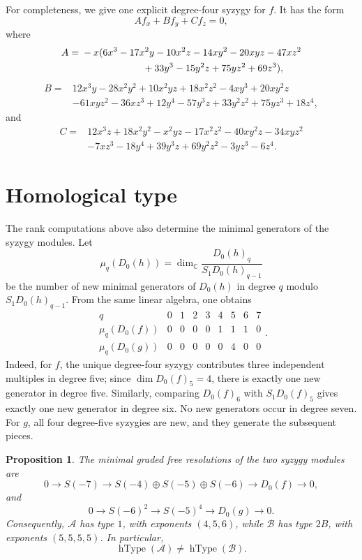 \documentclass[11pt]{amsart}
\newcommand{\CC}{\mathbb C}
\newcommand{\cA}{\mathcal A}
\newcommand{\cB}{\mathcal B}
\newcommand{\hType}{\operatorname{hType}}
\theoremstyle{plain}
\newtheorem{proposition}[theorem]{Proposition}
\theoremstyle{definition}
\numberwithin{equation}{section}
\begin{document}
For completeness, we give one explicit degree-four syzygy for \(f\).  It has the form
\[
A f_x+B f_y+C f_z=0,
\]
where
\[
\begin{aligned}
A={}&-x(6x^3-17x^2y-10x^2z-14xy^2-20xyz-47xz^2 \\
&\hspace{2.2cm}+33y^3-15y^2z+75yz^2+69z^3),
\end{aligned}
\]
\[
\begin{aligned}
B={}&12x^3y-28x^2y^2+10x^2yz+18x^2z^2-4xy^3+20xy^2z \\
&-61xyz^2-36xz^3+12y^4-57y^3z+33y^2z^2+75yz^3+18z^4,
\end{aligned}
\]
and
\[
\begin{aligned}
C={}&12x^3z+18x^2y^2-x^2yz-17x^2z^2-40xy^2z-34xyz^2 \\
&-7xz^3-18y^4+39y^3z+69y^2z^2-3yz^3-6z^4.
\end{aligned}
\]

\section{Homological type}

The rank computations above also determine the minimal generators of the syzygy modules.  Let
\[
\mu_q(D_0(h))
=
\dim_\CC \frac{D_0(h)_q}{S_1D_0(h)_{q-1}}
\]
be the number of new minimal generators of \(D_0(h)\) in degree \(q\) modulo $S_1 D_{0}(h)_{q-1}$.  From the same linear algebra, one obtains
\[
\begin{array}{c|cccccccc}
q &0&1&2&3&4&5&6&7\\
\hline
\mu_q(D_0(f))&0&0&0&0&1&1&1&0\\
\mu_q(D_0(g))&0&0&0&0&0&4&0&0
\end{array}.
\]
Indeed, for \(f\), the unique degree-four syzygy contributes three independent multiples in degree five; since \(\dim D_0(f)_5=4\), there is exactly one new generator in degree five.  Similarly, comparing \(D_0(f)_6\) with \(S_1D_0(f)_5\) gives exactly one new generator in degree six.  No new generators occur in degree seven.  For \(g\), all four degree-five syzygies are new, and they generate the subsequent pieces.

\begin{proposition}\label{prop:D0-resolutions}
The minimal graded free resolutions of the two syzygy modules are
\begin{equation}\label{eq:D0-f-resolution}
0\longrightarrow S(-7)
\longrightarrow S(-4)\oplus S(-5)\oplus S(-6)
\longrightarrow D_0(f)
\longrightarrow 0,
\end{equation}
and
\begin{equation}\label{eq:D0-g-resolution}
0\longrightarrow S(-6)^2
\longrightarrow S(-5)^4
\longrightarrow D_0(g)
\longrightarrow 0.
\end{equation}
Consequently, \(\cA\) has type \(1\), with exponents \((4,5,6)\), while \(\cB\) has type \(2B\), with exponents \((5,5,5,5)\).
In particular,
\[
\hType(\cA)\neq \hType(\cB).
\]
\end{proposition}
\end{document}

